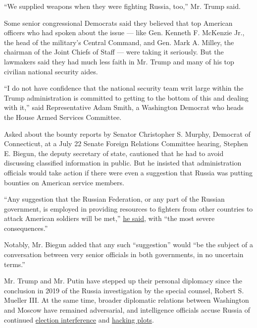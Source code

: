 ``We supplied weapons when they were fighting Russia, too,'' Mr. Trump
said.

Some senior congressional Democrats said they believed that top American
officers who had spoken about the issue --- like Gen. Kenneth F.
McKenzie Jr., the head of the military's Central Command, and Gen. Mark
A. Milley, the chairman of the Joint Chiefs of Staff --- were taking it
seriously. But the lawmakers said they had much less faith in Mr. Trump
and many of his top civilian national security aides.

``I do not have confidence that the national security team writ large
within the Trump administration is committed to getting to the bottom of
this and dealing with it,'' said Representative Adam Smith, a Washington
Democrat who heads the House Armed Services Committee.

Asked about the bounty reports by Senator Christopher S. Murphy,
Democrat of Connecticut, at a July 22 Senate Foreign Relations Committee
hearing, Stephen E. Biegun, the deputy secretary of state, cautioned
that he had to avoid discussing classified information in public. But he
insisted that administration officials would take action if there were
even a suggestion that Russia was putting bounties on American service
members.

``Any suggestion that the Russian Federation, or any part of the Russian
government, is employed in providing resources to fighters from other
countries to attack American soldiers will be met,''
\href{https://www.murphy.senate.gov/newsroom/press-releases/murphy-china-is-watching-our-failure-to-hold-russia-accountable-for-bounties-on-us-soldiers-in-afghanistan}{he
said}, with ``the most severe consequences.''

Notably, Mr. Biegun added that any such ``suggestion'' would ``be the
subject of a conversation between very senior officials in both
governments, in no uncertain terms.''

Mr. Trump and Mr. Putin have stepped up their personal diplomacy since
the conclusion in 2019 of the Russia investigation by the special
counsel, Robert S. Mueller III. At the same time, broader diplomatic
relations between Washington and Moscow have remained adversarial, and
intelligence officials accuse Russia of continued
\href{https://www.nytimes.com/2020/02/20/us/politics/russian-interference-trump-democrats.html}{election
interference} and
\href{https://www.nytimes.com/2020/01/10/us/politics/russia-hacking-disinformation-election.html}{hacking
plots}.

